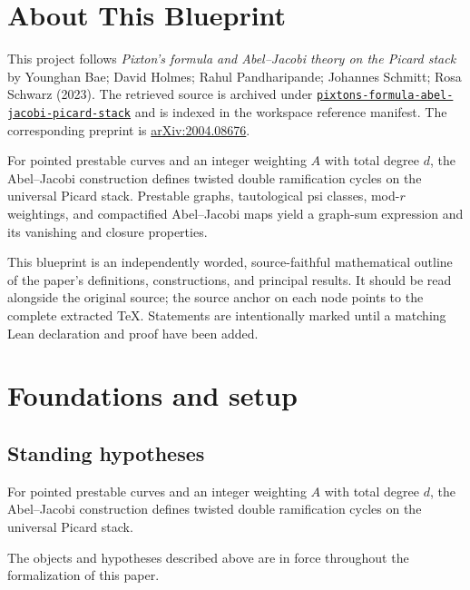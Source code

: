 

\chapter*{About This Blueprint}
\label{pixtons-formula-abel-jacobi-picard-stack-about}

This project follows \emph{Pixton's formula and Abel--Jacobi theory on the Picard stack} by Younghan Bae; David Holmes; Rahul Pandharipande; Johannes Schmitt; Rosa Schwarz (2023). The
retrieved source is archived under
\href{../../../../../references/pixtons-formula-abel-jacobi-picard-stack/}{\texttt{pixtons-formula-abel-jacobi-picard-stack}} and is indexed in
the workspace reference manifest. The corresponding preprint is
\href{https://arxiv.org/abs/2004.08676}{arXiv:2004.08676}.

For pointed prestable curves and an integer weighting $A$ with total degree $d$, the Abel--Jacobi construction defines twisted double ramification cycles on the universal Picard stack. Prestable graphs, tautological psi classes, mod-$r$ weightings, and compactified Abel--Jacobi maps yield a graph-sum expression and its vanishing and closure properties.

This blueprint is an independently worded, source-faithful mathematical
outline of the paper's definitions, constructions, and principal results. It
should be read alongside the original source; the source anchor on each node
points to the complete extracted TeX. Statements are intentionally marked
\notready until a matching Lean declaration and proof have been added.

\chapter{Foundations and setup}
\label{chap:pixtons-formula-abel-jacobi-picard-stack-foundations}

\section{Standing hypotheses}
\label{sec:pixtons-formula-abel-jacobi-picard-stack-standing}

For pointed prestable curves and an integer weighting $A$ with total degree $d$, the Abel--Jacobi construction defines twisted double ramification cycles on the universal Picard stack.

\begin{convention}
\label{pixtons-formula-abel-jacobi-picard-stack-setup}
The objects and hypotheses described above are in force throughout the
formalization of this paper.
\notready
\end{convention}

